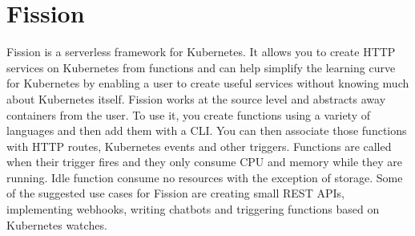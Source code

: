 \section{Fission}

Fission \cite{hid-sp18-521-FissionBlog} is a serverless framework for
Kubernetes. It allows you to create HTTP services on Kubernetes from
functions and can help simplify the learning curve for Kubernetes by
enabling a user to create useful services without knowing much about
Kubernetes itself. Fission works at the source level and abstracts 
away containers from the user. To use it, you create functions using
a variety of languages and then add them with a CLI. You can then 
associate those functions with HTTP routes, Kubernetes events and 
other triggers. Functions are called when their trigger fires and 
they only consume CPU and memory while they are running. Idle function 
consume no resources with the exception of storage. Some of the 
suggested use cases for Fission are creating small REST APIs, 
implementing webhooks, writing chatbots and triggering functions 
based on Kubernetes watches.
